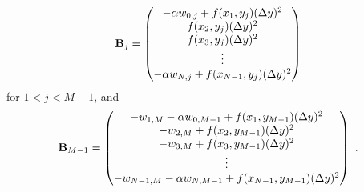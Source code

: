 \[
\mathbf{B}_j = \begin{pmatrix}
-\alpha w_{0,j} + f(x_1,y_j)(\Delta{y})^2\\
f(x_2,y_j)(\Delta{y})^2 \\
f(x_3,y_j)(\Delta{y})^2 \\
\vdots \\
-\alpha w_{N,j} + f(x_{N-1},y_j)(\Delta{y})^2
\end{pmatrix}
\]
for $1 <j < M-1$, and
\[\mathbf{B}_{M-1} = \begin{pmatrix}
-w_{1,M} - \alpha w_{0,M-1} + f(x_1,y_{M-1})(\Delta{y})^2\\
-w_{2,M} + f(x_2,y_{M-1})(\Delta{y})^2 \\
-w_{3,M} + f(x_3,y_{M-1})(\Delta{y})^2 \\
\vdots \\
-w_{N-1,M} -\alpha w_{N,M-1} + f(x_{N-1},y_{M-1})(\Delta{y})^2
\end{pmatrix} \ .
\]

